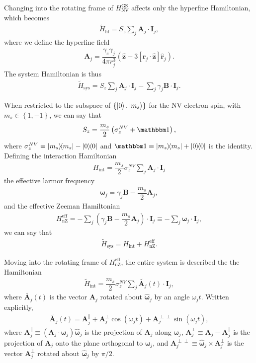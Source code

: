 \documentclass[twocolumn]{revtex4}
\renewcommand{\t}{\text} %
\newcommand{\f}[2]{\dfrac{#1}{#2}} %
\newcommand{\p}[1]{\left(#1\right)} %
\renewcommand{\sp}[1]{\left[#1\right]} %
\renewcommand{\set}[1]{\left\{#1\right\}} %
\renewcommand{\v}{\bm} %
\newcommand{\uv}[1]{\hat{\v{#1}}} %
\renewcommand{\c}{\cdot} %
\begin{document}
Changing into the rotating frame of $H_\t{NV}^\t{GS}$ affects only the
hyperfine Hamiltonian, which becomes
\begin{align}
  \tilde H_\t{hf} = S_z\sum_j \v A_j\c\v I_j,
\end{align}
where we define the hyperfine field
\begin{align}
  \v A_j = \f{\gamma_e\gamma_j}{4\pi r_j^3}\p{\uv z - 3\sp{\uv
  r_j\c\uv z}\uv r_j}.
\end{align}
The system Hamiltonian is thus
\begin{align}
  \tilde H_\t{sys} = S_z\sum_j \v A_j\c\v I_j
  -\sum_j\gamma_j\v B\c\v I_j.
\end{align}

When restricted to the subspace of $\set{\ket0,\ket{m_s}}$ for the NV
electron spin, with $m_s\in\set{1,-1}$, we can say that
\begin{align}
  S_z = \f{m_s}2\p{\sigma_z^{NV}+\mathbbm1},
\end{align}
where $\sigma_z^{NV}\equiv\op{m_s}-\op{0}$ and
$\mathbbm1\equiv\op{m_s}+\op{0}$ is the identity. Defining the
interaction Hamiltonian
\begin{align}
  H_\t{int} = \f{m_s}2\sigma_z^{NV}\sum_j\v A_j\c\v I_j
\end{align}
the effective larmor frequency
\begin{align}
  \v\omega_j = \gamma_j\v B - \f{m_s}2\v A_j,
\end{align}
and the effective Zeeman Hamiltonian
\begin{align}
  H_\t{nZ}^\t{eff} = -\sum_j\p{\gamma_j\v B - \f{m_s}2\v A_j}\c\v I_j
  \equiv -\sum_j\v\omega_j\c\v I_j,
\end{align}
we can say that
\begin{align}
  \tilde H_\t{sys} = H_\t{int} + H_\t{nZ}^\t{eff}.
  \label{H_sys_int_nZ}
\end{align}

Moving into the rotating frame of $H_\t{nZ}^\t{eff}$, the entire
system is described the the Hamiltonian
\begin{align}
  \tilde H_\t{int} = \f{m_s}2\sigma_z^{NV}
  \sum_j\tilde{\v A_j}\p{t}\c\v I_j,
  \label{H_int_no_DD}
\end{align}
where $\tilde{\v A_j}\p{t}$ is the vector $\v A_j$ rotated about
$\uv\omega_j$ by an angle $\omega_jt$. Written explicitly,
\begin{align}
  \tilde{\v A_j}\p{t} = \v A_j^\parallel + \v A_j^\perp\cos\p{\omega_jt}
  + \v A_j^{\perp\perp}\sin\p{\omega_jt},
  \label{A_rot}
\end{align}
where $\v A_j^\parallel\equiv\p{\v A_j\c\uv\omega_j}\uv\omega_j$ is
the projection of $\v A_j$ along $\v \omega_j$,
$\v A_j^\perp\equiv\v A_j-\v A_j^\parallel$ is the projection of
$\v A_j$ onto the plane orthogonal to $\v\omega_j$, and
$\v A_j^{\perp\perp}\equiv\uv\omega_j\times\v A_j^\perp$ is the vector
$\v A_j^\perp$ rotated about $\uv\omega_j$ by $\pi/2$.
\end{document}
